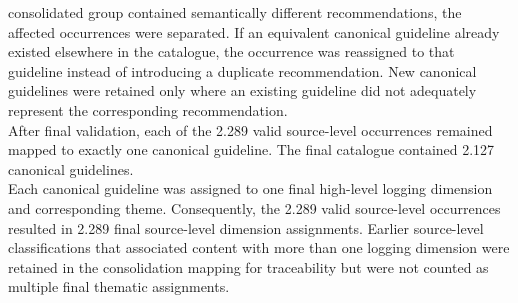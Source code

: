 consolidated group contained semantically different recommendations, the affected
occurrences were separated. If an equivalent canonical guideline already existed
elsewhere in the catalogue, the occurrence was reassigned to that guideline instead
of introducing a duplicate recommendation. New canonical guidelines were retained
only where an existing guideline did not adequately represent the corresponding
recommendation.
\\
After final validation, each of the 2.289 valid source-level occurrences remained
mapped to exactly one canonical guideline. The final catalogue contained 2.127
canonical guidelines.
\\
Each canonical guideline was assigned to one final high-level logging
dimension and corresponding theme. Consequently, the 2.289 valid source-level
occurrences resulted in 2.289 final source-level dimension assignments.
Earlier source-level classifications that associated content with more than
one logging dimension were retained in the consolidation mapping for
traceability but were not counted as multiple final thematic assignments.

